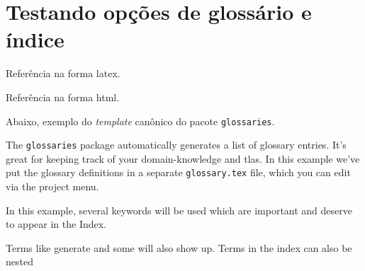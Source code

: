 \chapter{Testando opções de glossário e índice}

Referência na forma \gls{latex}.

Referência na forma \gls{html}.

Abaixo, exemplo do \textit{template} canônico do pacote \texttt{glossaries}.

The \texttt{glossaries} package automatically generates a list of glossary entries. It's great for keeping track of your \gls{domain-knowledge} and \glspl{tla}. In this example we've put the glossary definitions in a separate \texttt{glossary.tex} file, which you can edit via the project menu.

In this example, several keywords will be used 
which are important and deserve to appear in the Index.

Terms like generate and some will also 
show up. Terms in the index can also be nested 
